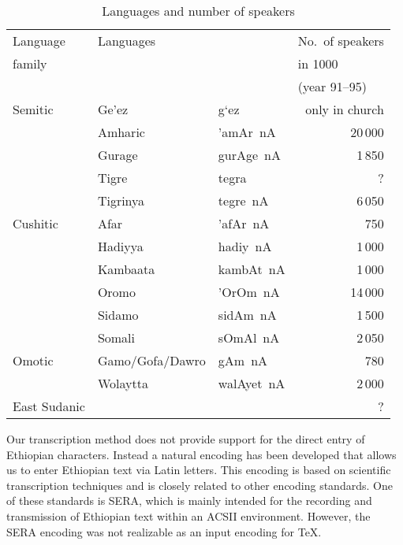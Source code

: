 \documentclass[a4paper]{article}
\newcommand{\eth}{\selectlanguage{ethiop}}
\begin{document}
\begin{table}[t]
\begin{center}
\begin{tabular}{|l|ll|r|}
\hline
  Language     & Languages       & &
    \multicolumn{1}{|l|}{No.~of speakers} \\
  family       &                 & &
    \multicolumn{1}{|l|}{in 1000} \\
               &                 & &
    \multicolumn{1}{|l|}{(year 91--95)} \\
\hline
  Semitic      & Ge'ez           & {\eth g`ez}        & only in church \\
               & Amharic         & {\eth 'amAr~nA}    & 20\,000 \\
               & Gurage          & {\eth gurAge~nA}   &  1\,850 \\
               & Tigre           & {\eth tegra}       &       ? \\
               & Tigrinya        & {\eth tegre~nA}    &  6\,050 \\
\hline
  Cushitic     & Afar            & {\eth 'afAr~nA}    &     750 \\
               & Hadiyya         & {\eth hadiy~nA}    &  1\,000 \\
               & Kambaata        & {\eth kambAt~nA}   &  1\,000 \\
               & Oromo           & {\eth 'OrOm~nA}    & 14\,000 \\
               & Sidamo          & {\eth sidAm~nA}    &  1\,500 \\
               & Somali          & {\eth sOmAl~nA}    &  2\,050 \\
\hline
  Omotic       & Gamo/Gofa/Dawro & {\eth gAm~nA}      &     780 \\
               & Wolaytta        & {\eth walAyet~nA}  &  2\,000 \\
\hline
  East Sudanic &                 &                    &       ? \\
\hline
\end{tabular}
\end{center}
\caption{\label{tab:speakers}Languages and number of speakers}
\end{table}

Our transcription method does not provide support for the direct
entry of Ethiopian characters. Instead a natural encoding
has been developed that allows us to enter Ethiopian
text via Latin letters. This encoding is based on 
scientific transcription techniques and is closely related
to other encoding standards. One of these standards is
SERA, which is mainly intended for the recording and
transmission of Ethiopian text within an ACSII environment.
However, the SERA encoding was not realizable as an
input encoding for \TeX.
\end{document}
